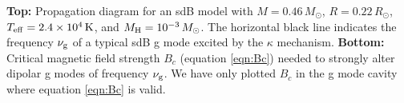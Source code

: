 \label{fig:sdBProp}
{\bf Top:} Propagation diagram for an sdB model with $M=0.46 \, M_\odot$, $R= 0.22 \, R_\odot$, $T_{\rm eff} = 2.4 \times 10^4 \, {\rm K}$, and $M_{\rm H} = 10^{-3} \, M_\odot$. The horizontal black line indicates the frequency $\nu_{\rm g}$ of a typical sdB g mode excited by the $\kappa$ mechanism. {\bf Bottom:} Critical magnetic field strength $B_c$ (equation \ref{eqn:Bc}) needed to strongly alter dipolar g modes of frequency $\nu_{\rm g}$. We have only plotted $B_c$ in the g mode cavity where equation \ref{eqn:Bc} is valid.
  
  
  